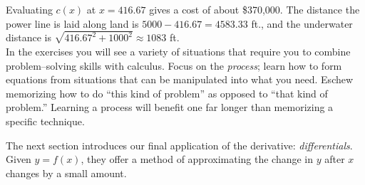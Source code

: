 {Evaluating $c(x)$ at $x=416.67$ gives a cost of about \$370,000. The distance the power line is laid along land is $5000-416.67 = 4583.33$ ft., and the underwater distance is $\sqrt{416.67^2+1000^2} \approx 1083$ ft.
}\\

In the exercises you will see a variety of situations that require you to combine problem--solving skills with calculus. Focus on the \textit{process}; learn how to form equations from situations that can be manipulated into what you need. Eschew memorizing how to do ``this kind of problem'' as opposed to ``that kind of problem.'' Learning a process will benefit one far longer than memorizing a specific technique.

The next section introduces our final application of the derivative: \textit{differentials}. Given $y=f(x)$, they offer a method of approximating the change in $y$ after $x$ changes by a small amount. 

		